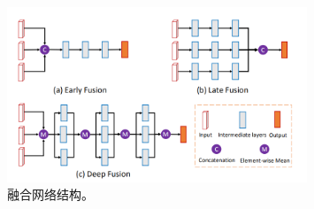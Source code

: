 \begin{figure}
	\centering
	\includegraphics[width=0.8\textwidth]{imgs/fusion-network.png}
	\caption{融合网络结构。}
	\label{fig:fusion_network}
\end{figure}

